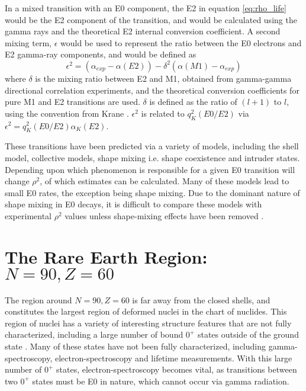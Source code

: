 In a mixed transition with an E0 component, the E2 in equation \ref{eq:rho_life} would be the E2 component of the transition, and would be calculated using the gamma rays and the theoretical E2 internal conversion coefficient\citep{church58:_monopole}. A second mixing term, $\epsilon$ would be used to represent the ratio between the E0 electrons and E2 gamma-ray components, and would be defined as 
\begin{equation}
\label{eq:epsilon}
    \epsilon^2=(\alpha_{exp}-\alpha(E2))-\delta^2(\alpha(M1)-\alpha_{exp})
\end{equation}
where $\delta$ is the mixing ratio between E2 and M1, obtained from gamma-gamma directional correlation experiments, and the theoretical conversion coefficients for pure M1 and E2 transitions are used. $\delta$ is defined as the ratio of $(l+1)$ to $l$, using the convention from Krane \citep{krane70:_delta_mixing}. $\epsilon^2$ is related to $q_K^2(E0/E2)$ via $\epsilon^2=q_K^2(E0/E2)\alpha_K(E2)$. 

These transitions have been predicted via a variety of models, including the shell model, collective models, shape mixing i.e. shape coexistence and intruder states\citep{wood99:_e0}. Depending upon which phenomenon is responsible for a given E0 transition will change $\rho^2$, of which estimates can be calculated. Many of these models lead to small E0 rates, the exception being shape mixing. Due to the dominant nature of shape mixing in E0 decays, it is difficult to compare these models with experimental $\rho^2$ values unless shape-mixing effects have been removed \citep{wood99:_e0}.

\section{The Rare Earth Region: $N=90,Z=60$}
\label{sec:rare_earth}

The region around $N=90,Z=60$ is far away from the closed shells, and constitutes the largest region of deformed nuclei in the chart of nuclides. This region of nuclei has a variety of interesting structure features that are not fully characterized, including a large number of bound $0^+$ states outside of the ground state \citep{meyer06:_zeroplus}. Many of these states have not been fully characterized, including gamma-spectroscopy, electron-spectroscopy and lifetime measurements. With this large number of $0^+$ states, electron-spectroscopy becomes vital, as transitions between two $0^+$ states must be E0 in nature, which cannot occur via gamma radiation.

